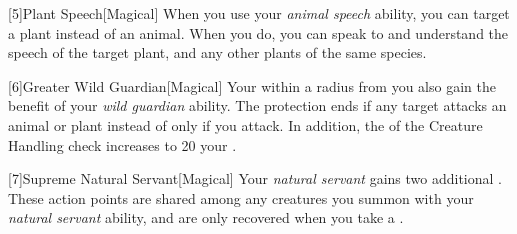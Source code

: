         [5]{Plant Speech}[Magical] When you use your \textit{animal speech} ability, you can target a plant instead of an animal.
        When you do, you can speak to and understand the speech of the target plant, and any other plants of the same species.

        [6]{Greater Wild Guardian}[Magical] Your  within a \arealarge radius  from you also gain the benefit of your \textit{wild guardian} ability.
        The protection ends if any target attacks an animal or plant instead of only if you attack.
        In addition, the  of the Creature Handling check increases to 20 \add your .

        [7]{Supreme Natural Servant}[Magical] Your \textit{natural servant} gains two additional .
        These action points are shared among any creatures you summon with your \textit{natural servant} ability, and are only recovered when you take a .

